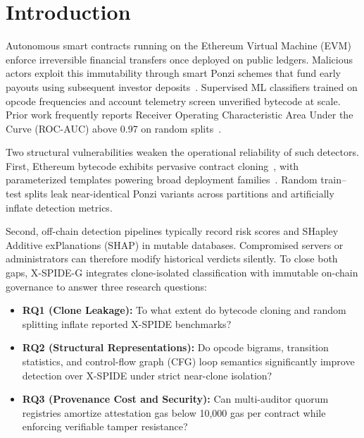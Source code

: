 \documentclass[conference]{IEEEtran}
\begin{document}
\section{Introduction}\label{sec:intro}

Autonomous smart contracts running on the Ethereum Virtual Machine (EVM) enforce irreversible financial transfers once deployed on public ledgers. Malicious actors exploit this immutability through smart Ponzi schemes that fund early payouts using subsequent investor deposits~\cite{bartoletti2020dissecting}. Supervised ML classifiers trained on opcode frequencies and account telemetry screen unverified bytecode at scale. Prior work frequently reports Receiver Operating Characteristic Area Under the Curve (ROC-AUC) above 0.97 on random splits~\cite{pennella2025xspide}.

Two structural vulnerabilities weaken the operational reliability of such detectors. First, Ethereum bytecode exhibits pervasive contract cloning~\cite{he2020clones}, with parameterized templates powering broad deployment families~\cite{kondo2020cloning}. Random train--test splits leak near-identical Ponzi variants across partitions and artificially inflate detection metrics.

Second, off-chain detection pipelines typically record risk scores and SHapley Additive exPlanations (SHAP) in mutable databases. Compromised servers or administrators can therefore modify historical verdicts silently. To close both gaps, X-SPIDE-G integrates clone-isolated classification with immutable on-chain governance to answer three research questions:
\begin{itemize}
\item \textbf{RQ1 (Clone Leakage):} To what extent do bytecode cloning and random splitting inflate reported X-SPIDE benchmarks?
\item \textbf{RQ2 (Structural Representations):} Do opcode bigrams, transition statistics, and control-flow graph (CFG) loop semantics significantly improve detection over X-SPIDE under strict near-clone isolation?
\item \textbf{RQ3 (Provenance Cost and Security):} Can multi-auditor quorum registries amortize attestation gas below 10,000 gas per contract while enforcing verifiable tamper resistance?
\end{itemize}
\end{document}
